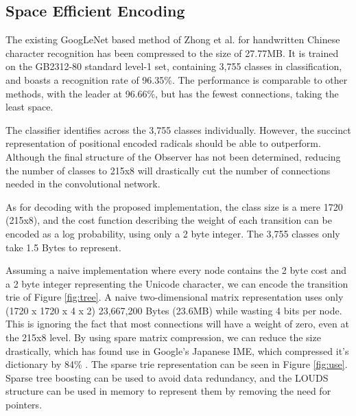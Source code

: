 \subsection{Space Efficient Encoding}
The existing GoogLeNet based method of Zhong et al. for handwritten Chinese character recognition has been compressed to the size of 27.77MB\cite{hccr-googlenet}. It is trained on the GB2312-80 standard level-1 set, containing 3,755 classes in classification, and boasts a recognition rate of 96.35\%. The performance is comparable to other methods, with the leader at 96.66\%\cite{denseran}, but has the fewest connections, taking the least space.

The classifier identifies across the 3,755 classes individually. However, the succinct representation of positional encoded radicals should be able to outperform. Although the final structure of the Observer has not been determined, reducing the number of classes to 215x8 will drastically cut the number of connections needed in the convolutional network.

As for decoding with the proposed implementation, the class size is a mere 1720 (215x8), and the cost function describing the weight of each transition can be encoded as a log probability, using only a 2 byte integer. The 3,755 classes only take 1.5 Bytes to represent.


Assuming a naive implementation where every node contains the 2 byte cost and a 2 byte integer representing the Unicode character, we can encode the transition trie of Figure \ref{fig:tree}. A naive two-dimensional matrix representation uses only (1720 x 1720 x 4 x 2) 23,667,200 Bytes (23.6MB) while wasting 4 bits per node. This is ignoring the fact that most connections will have a weight of zero, even at the 215x8 level. By using spare matrix compression, we can reduce the size drastically, which has found use in Google's Japanese IME, which compressed it's dictionary by 84\% \cite{ime-compression}.
The sparse trie representation can be seen in Figure \ref{fig:use}. Sparse tree boosting \cite{sparse-tree-boosting} can be used to avoid data redundancy, and the LOUDS structure \cite{louds-structure} can be used in memory to represent them by removing the need for pointers.